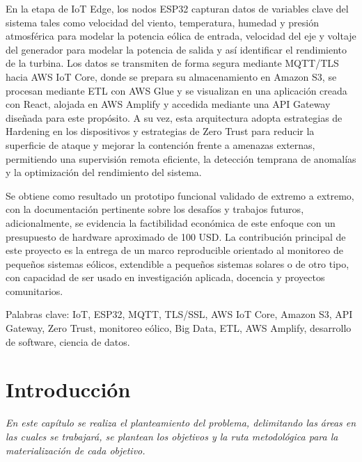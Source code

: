 \documentclass[letterpaper,12pt, oneside]{book}
\begin{document}
En la etapa de IoT Edge, los nodos ESP32 capturan datos de variables clave del sistema tales como velocidad del viento, temperatura, humedad y presión atmosférica para modelar la potencia eólica de entrada, velocidad del eje y voltaje del generador para modelar la potencia de salida y así identificar el rendimiento de la turbina. Los datos se transmiten de forma segura mediante MQTT/TLS hacia AWS IoT Core, donde se prepara su almacenamiento en Amazon S3, se procesan mediante ETL con AWS Glue y se visualizan en una aplicación creada con React, alojada en AWS Amplify y accedida mediante una API Gateway diseñada para este propósito. A su vez, esta arquitectura adopta estrategias de Hardening en los dispositivos y estrategias de Zero Trust para reducir la superficie de ataque y mejorar la contención frente a amenazas externas, permitiendo una supervisión remota eficiente, la detección temprana de anomalías y la optimización del rendimiento del sistema. 

Se obtiene como resultado un prototipo funcional validado de extremo a extremo, con la documentación pertinente sobre los desafíos y trabajos futuros, adicionalmente, se evidencia la factibilidad económica de este enfoque con un presupuesto de hardware aproximado de 100 USD. La contribución principal de este proyecto es la entrega de un marco reproducible orientado al monitoreo de pequeños sistemas eólicos, extendible a pequeños sistemas solares o de otro tipo, con capacidad de ser usado en investigación aplicada, docencia y proyectos comunitarios. 

Palabras clave: IoT, ESP32, MQTT, TLS/SSL, AWS IoT Core, Amazon S3, API Gateway, Zero Trust, monitoreo eólico, Big Data, ETL, AWS Amplify, desarrollo de software, ciencia de datos. 


\newpage
\tableofcontents
{}
\renewcommand{\listtablename}{Índice de tablas}
\listoftables
{}
\listoffigures
{}
\cleardoublepage
{}
\printnomenclature[2cm]

\newpage
\chapter{Introducción}
\label{Cap1}

\textit{En este capítulo se realiza el planteamiento del problema, delimitando las áreas en las cuales se trabajará, se plantean los objetivos y la ruta metodológica para la materialización de cada objetivo.}\\
\end{document}
